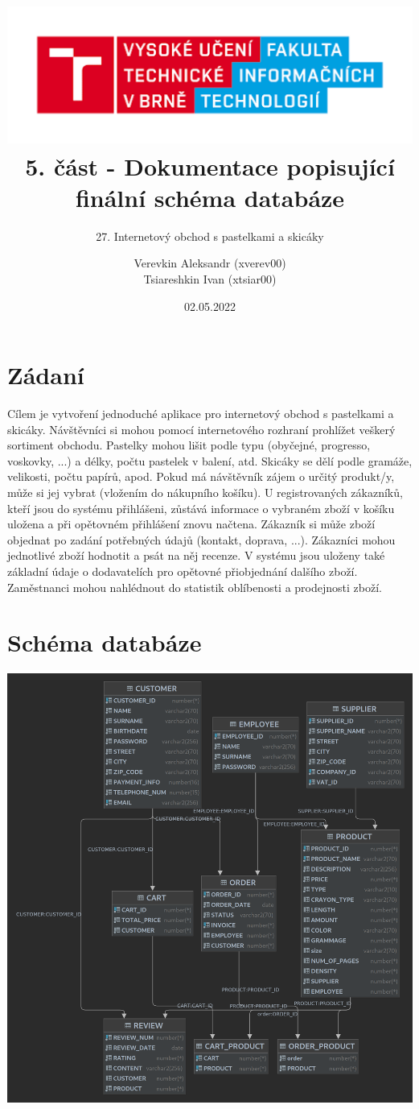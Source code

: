 \documentclass[12pt]{article}
\title{
\includegraphics[scale=0.7]{logo (1).png}\\
\huge{5. část - Dokumentace popisující finální schéma databáze}
}
\subtitle{27. Internetový obchod s pastelkami a skicáky}
\author{Verevkin Aleksandr (xverev00)\\
        Tsiareshkin Ivan (xtsiar00)}
\date{02.05.2022}
\begin{document}
\pagecolor{white}
\maketitle
\thispagestyle{empty}
\newpage

\section*{Zádaní}
    \indent Cílem je vytvoření jednoduché aplikace pro internetový obchod s pastelkami
    a skicáky. Návštěvníci si mohou pomocí internetového rozhraní prohlížet veškerý 
    sortiment obchodu. Pastelky mohou lišit podle typu (obyčejné, progresso,
    voskovky, ...) a délky, počtu pastelek v balení, atd. Skicáky se dělí podle gramáže, velikosti, počtu papírů, apod. Pokud má návštěvník zájem o určitý produkt/y, 
    může si jej vybrat (vložením do nákupního košíku). U registrovaných zákazníků, kteří jsou do systému přihlášeni, zůstává informace o vybraném zboží v košíku uložena a 
    při opětovném přihlášení znovu načtena. Zákazník si může zboží objednat po zadání potřebných údajů (kontakt, doprava, ...). Zákazníci mohou jednotlivé zboží hodnotit 
    a psát na něj recenze. V systému jsou uloženy také základní údaje o dodavatelích pro opětovné přiobjednání dalšího zboží. Zaměstnanci mohou nahlédnout do statistik oblíbenosti a prodejnosti zboží.
    
\section*{Schéma databáze}
    \begin{center}
        \includegraphics[scale=0.19]{11.png}
    \end{center}
    
\end{document}
